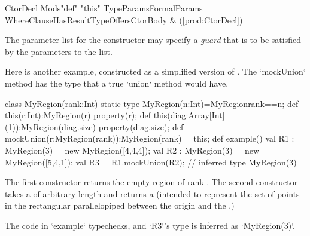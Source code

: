\begin{bbgrammar}
 CtorDecl    \: Mods\opt \xcd"def" \xcd"this" TypeParams\opt FormalParams WhereClause\opt HasResultType\opt Offers\opt CtorBody & (\ref{prod:CtorDecl})\\%
\end{bbgrammar}


\label{ConstructorGuard}

The parameter list for the constructor
may specify a \emph{guard} that is to be satisfied by the parameters
to the list.

\begin{example}
Here is another example, constructed as a simplified 
version of .  The \xcd`mockUnion` method 
has the type that a true \xcd`union` method would have.

\begin{xten}
class MyRegion(rank:Int) {
  static type MyRegion(n:Int)=MyRegion{rank==n};
  def this(r:Int):MyRegion(r) {
    property(r);
  }
  def this(diag:Array[Int](1)):MyRegion(diag.size){ 
    property(diag.size);
  }
  def mockUnion(r:MyRegion(rank)):MyRegion(rank) = this;
  def example() {
    val R1 : MyRegion(3) = new MyRegion([4,4,4]); 
    val R2 : MyRegion(3) = new MyRegion([5,4,1]); 
    val R3 = R1.mockUnion(R2); // inferred type MyRegion(3)
  }
}
\end{xten}
%
The first constructor returns the empty region of rank .  The
second constructor takes a  of arbitrary length
 and returns a  (intended to represent the set
of points in the rectangular parallelopiped between the origin and the
.)

The code in \xcd`example` typechecks, and \xcd`R3`'s type is inferred as
\xcd`MyRegion(3)`.  


\end{example}

